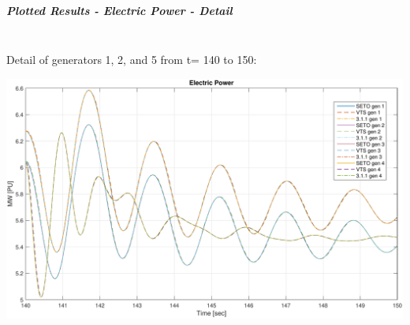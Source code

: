 \documentclass[12pt]{article}
\begin{document}
\subparagraph{Plotted Results - Electric Power - Detail} \ \\
Detail of generators 1, 2, and 5 from t= 140 to 150:

\includegraphics[width=\linewidth]{verPelectDetail}
\end{document}

